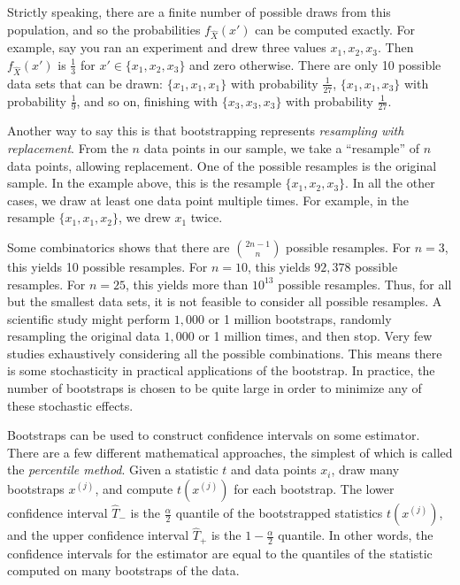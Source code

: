 Strictly speaking, there are a finite number of possible draws from this population, and so the probabilities $f_{\hat{X}}(x')$ can be computed exactly. For example, say you ran an experiment and drew three values $x_1, x_2, x_3$. Then $f_{\hat{X}}(x')$ is $\tfrac{1}{3}$ for $x' \in \{x_1,x_2,x_3\}$ and zero otherwise. There are only 10 possible data sets that can be drawn: $\{x_1,x_1,x_1\}$ with probability $\tfrac{1}{27}$, $\{x_1,x_1,x_3\}$ with probability $\tfrac{1}{9}$, and so on, finishing with $\{x_3,x_3,x_3\}$ with probability $\tfrac{1}{27}$.

Another way to say this is that bootstrapping represents \emph{resampling with replacement}. From the $n$ data points in our sample, we take a ``resample'' of $n$ data points, allowing replacement. One of the possible resamples is the original sample. In the example above, this is the resample $\{x_1,x_2,x_3\}$. In all the other cases, we draw at least one data point multiple times. For example, in the resample $\{x_1,x_1,x_2\}$, we drew $x_1$ twice.

Some combinatorics shows that there are $\binom{2n-1}{n}$ possible resamples. For $n=3$, this yields 10 possible resamples. For $n=10$, this yields $92,378$ possible resamples. For $n=25$, this yields more than $10^{13}$ possible resamples. Thus, for all but the smallest data sets, it is not feasible to consider all possible resamples. A scientific study might perform $1,000$ or 1 million bootstraps, randomly resampling the original data $1,000$ or 1 million times, and then stop. Very few studies exhaustively considering all the possible combinations. This means there is some stochasticity in practical applications of the bootstrap. In practice, the number of bootstraps is chosen to be quite large in order to minimize any of these stochastic effects.

Bootstraps can be used to construct confidence intervals on some estimator. There are a few different mathematical approaches, the simplest of which is called the \emph{percentile method}. Given a statistic $t$ and data points $x_i$, draw many bootstraps $x^{(j)}$, and compute $t(x^{(j)})$ for each bootstrap. The lower confidence interval $\hat{T}_-$ is the $\tfrac{\alpha}{2}$ quantile of the bootstrapped statistics $t(x^{(j)})$, and the upper confidence interval $\hat{T}_+$ is the $1-\tfrac{\alpha}{2}$ quantile. In other words, the confidence intervals for the estimator are equal to the quantiles of the statistic computed on many bootstraps of the data.


